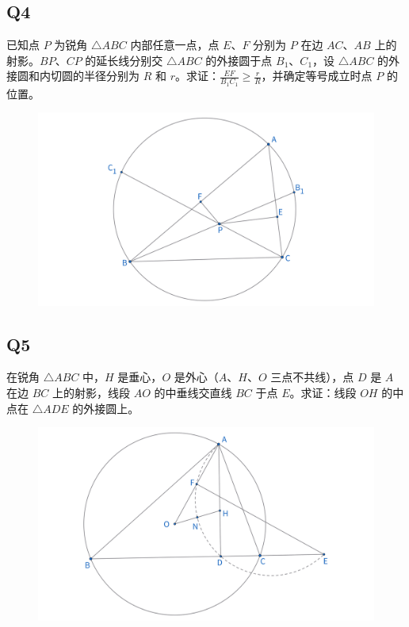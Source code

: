 \documentclass{article}
\begin{document}
\subsection{Q4}
已知点 $P$ 为锐角 $\triangle ABC$ 内部任意一点，点 $E$、$F$ 分别为 $P$ 在边 $AC$、$AB$ 上的射影。$BP$、$CP$ 的延长线分别交 $\triangle ABC$ 的外接圆于点 $B_1$、$C_1$，设 $\triangle ABC$ 的外接圆和内切圆的半径分别为 $R$ 和 $r$。求证：$\frac{EF}{B_1C_1} \geq \frac{r}{R}$，并确定等号成立时点 $P$ 的位置。
\begin{figure}[htbp]
    \centering
    \includegraphics[width=0.8\linewidth]{figures/西部赛12年Q4.png}
\end{figure}


\subsection{Q5}
在锐角 $\triangle ABC$ 中，$H$ 是垂心，$O$ 是外心（$A$、$H$、$O$ 三点不共线），点 $D$ 是 $A$ 在边 $BC$ 上的射影，线段 $AO$ 的中垂线交直线 $BC$ 于点 $E$。求证：线段 $OH$ 的中点在 $\triangle ADE$ 的外接圆上。
\begin{figure}[htbp]
    \centering
    \includegraphics[width=0.8\linewidth]{figures/西部赛12年Q5.png}
\end{figure}



\newpage 
\end{document}
